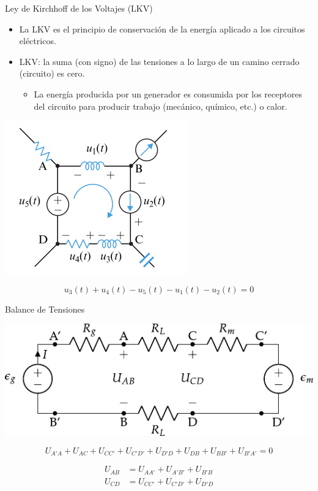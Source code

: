 \documentclass[aspectratio=169, usenames,svgnames,dvipsnames]{beamer}
\begin{document}
\begin{frame}[label={sec:orga89f209}]{Ley de Kirchhoff de los Voltajes (LKV)}
\begin{itemize}
\item La \alert{LKV} es el principio de conservación de la energía aplicado a los circuitos eléctricos.

\item \alert{LKV}: la suma (con signo) de las tensiones a lo largo de un camino cerrado (circuito) es cero.

\begin{itemize}
\item La energía producida por un generador es consumida por los receptores del circuito para producir trabajo (mecánico, químico, etc.) o calor.
\end{itemize}
\end{itemize}

\begin{center}
\includegraphics[height=0.4\textheight]{../figs/LKV_FM.pdf}
\end{center}
\[
u_3(t) + u_4 (t) - u_5 (t) - u_1 (t) - u_2 (t)  = 0
\]
\end{frame}

\begin{frame}[label={sec:org0cf7f7d}]{Balance de Tensiones}
\begin{center}
\includegraphics[height=0.5\textheight]{../figs/circuito_lkv.pdf}
\end{center}

\begin{equation*}
  U_{A'A} + U_{AC} + U_{CC'} + U_{C'D'} + U_{D'D} + U_{DB} + U_{BB'} + U_{B'A'} = 0
\end{equation*}

\begin{align*}
  U_{AB} &= U_{AA'} + U_{A'B'} + U_{B'B}\\
  U_{CD} &= U_{CC'} + U_{C'D'} + U_{D'D}
\end{align*}
\end{frame}
\end{document}
